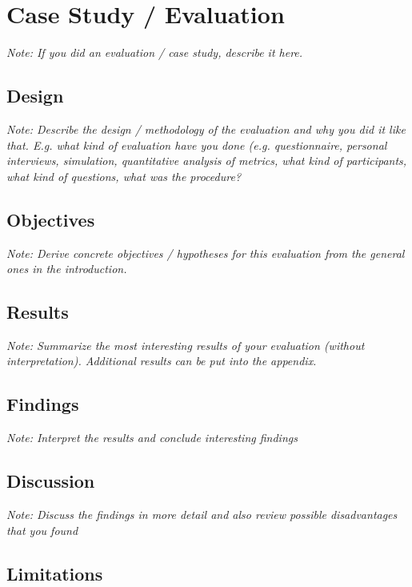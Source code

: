\documentclass[a4paper,12pt,twoside]{report}
\begin{document}

\chapter{Case Study / Evaluation}

\textit{Note: If you did an evaluation / case study, describe it here.}

\section{Design}

\textit{Note: Describe the design / methodology of the evaluation and why you did it like that. E.g. what kind of evaluation have you done (e.g. questionnaire, personal interviews, simulation, quantitative analysis of metrics, what kind of participants, what kind of questions, what was the procedure?}

\section{Objectives}

\textit{Note: Derive concrete objectives / hypotheses for this evaluation from the general ones in the introduction.}

\section{Results}

\textit{Note: Summarize the most interesting results of your evaluation (without interpretation). Additional results can be put into the appendix.}

\section{Findings}

\textit{Note: Interpret the results and conclude interesting findings}

\section{Discussion}

\textit{Note: Discuss the findings in more detail and also review possible disadvantages that you found}

\section{Limitations}
\end{document}
